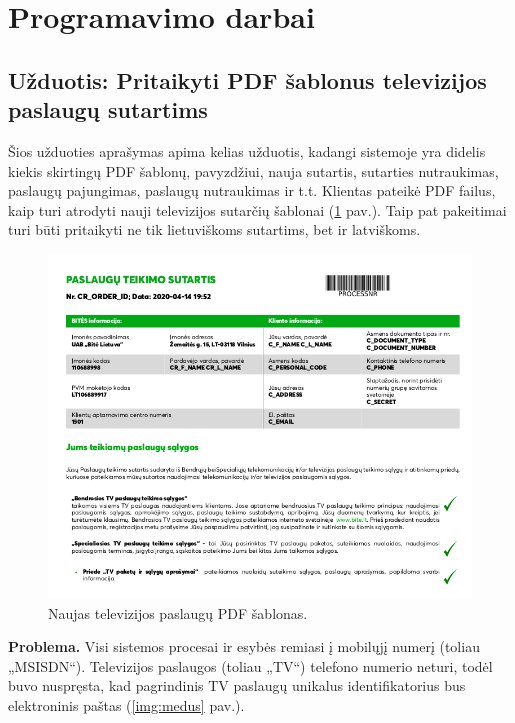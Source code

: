 \section{Programavimo darbai}

\subsection{Užduotis: Pritaikyti PDF šablonus televizijos paslaugų sutartims}
Šios užduoties aprašymas apima kelias užduotis, kadangi sistemoje yra didelis kiekis skirtingų PDF šablonų,
pavyzdžiui, nauja sutartis, sutarties nutraukimas, paslaugų pajungimas, paslaugų nutraukimas ir t.t.
Klientas pateikė PDF failus, kaip turi atrodyti nauji televizijos sutarčių šablonai (\ref{img:contract} pav.).
Taip pat pakeitimai turi būti pritaikyti ne tik lietuviškoms sutartims, bet ir latviškoms.

\begin{figure}[H]
    \centering
    \includegraphics[scale=0.5]{img/contract.png}
    \caption{Naujas televizijos paslaugų PDF šablonas.}
    \label{img:contract}
\end{figure}

\textbf{Problema.} Visi sistemos procesai ir esybės remiasi į mobilųjį numerį (toliau „MSISDN“). Televizijos paslaugos (toliau „TV“) telefono numerio neturi, todėl buvo nuspręsta,
kad pagrindinis TV paslaugų unikalus identifikatorius bus elektroninis paštas (\ref{img:medus} pav.).

